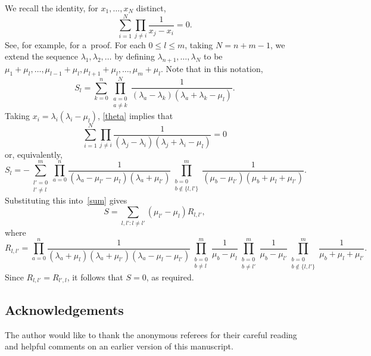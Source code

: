\documentclass[pdftex]{sigma}
\theoremstyle{definition}
\begin{document}
We recall the identity, for $x_1,\dots,x_N$ distinct,
\begin{equation}\label{theta}
\sum_{i=1}^N \prod_{j\ne i} \frac1{x_j-x_i} =0.
\end{equation}
See, for example, \cite[equation (8.17)]{noc13} for a~proof.
For each $0\le l\le m$, taking $N=n+m-1$, we extend the sequence $\lambda_1,\lambda_2,\dots$
by defining $\lambda_{n+1},\dots,\lambda_N$ to be
$\mu_1+\mu_l,\dots,\mu_{l-1}+\mu_l,{\mu_{l+1}+\mu_l},\allowbreak\dots,\mu_m+\mu_l$.
Note that in this notation,
\[S_l= \sum_{k=0}^n \prod_{\substack{a=0\\ a\ne k}}^{N} \frac{1}{(\lambda_a-\lambda_k)(\lambda_a+\lambda_k-\mu_l)}.\]
Taking $x_i=\lambda_i(\lambda_i-\mu_l)$, \eqref{theta} implies that
\[\sum_{i=1}^N \prod_{j\ne i} \frac1{(\lambda_j-\lambda_i)(\lambda_j+\lambda_i-\mu_l)} =0\]
or, equivalently,
\[S_l=-\sum_{\substack{l'=0\\l'\ne l}}^m \prod_{a=0}^n\frac1{(\lambda_a-\mu_{l'}-\mu_l)(\lambda_a+\mu_{l'})}
\prod_{\substack{b=0\\ b\notin\{ l,l'\} }}^{m} \frac1{(\mu_b-\mu_{l'})(\mu_b+\mu_l+\mu_{l'})}.\]
Substituting this into~\eqref{sum} gives
\[S=\sum_{l,l'\colon l\ne l'} (\mu_{l'}-\mu_l) R_{l,l'},\]
where
\[
R_{l,l'}= \prod_{a=0}^n\frac1{(\lambda_a+\mu_l)(\lambda_a+\mu_{l'})(\lambda_a-\mu_l-\mu_{l'})} \prod_{\substack{b=0\\ b\ne l}}^{m} \frac1{\mu_b-\mu_l}
\prod_{\substack{b=0\\ b\ne l'}}^{m} \frac1{\mu_b-\mu_{l'}}
\prod_{\substack{b=0\\ b\notin\{ l,l'\} }}^{m} \frac1{\mu_b+\mu_l+\mu_{l'}}.
\]
Since $R_{l,l'}=R_{l',l}$, it follows that $S=0$, as required.

\subsection*{Acknowledgements}

The author would like to thank the anonymous referees for their careful reading and helpful comments on an earlier version of this manuscript.
\end{document}
